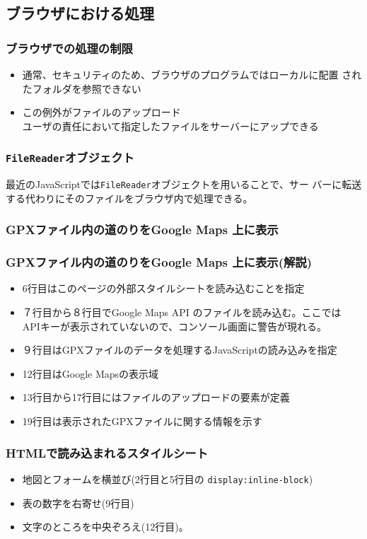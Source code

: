 \subsection{ブラウザにおける処理}
\begin{frame}[containsverbatim]
 \frametitle{ブラウザでの処理の制限}
 \begin{itemize}
  \item 通常、セキュリティのため、ブラウザのプログラムではローカルに配置
        されたフォルダを参照できない
  \item この例外がファイルのアップロード\\
        ユーザの責任において指定したファイルをサーバーにアップできる
 \end{itemize}
\end{frame}
\begin{frame}[containsverbatim]
 \frametitle{\texttt{FileReader}オブジェクト}
最近のJavaScriptでは\texttt{FileReader}オブジェクトを用いることで、サー
 バーに転送する代わりにそのファイルをブラウザ内で処理できる。
\end{frame}
\begin{frame}[containsverbatim]
 \frametitle{GPXファイル内の道のりをGoogle Maps 上に表示}
\end{frame}
\begin{frame}[containsverbatim]
 \frametitle{GPXファイル内の道のりをGoogle Maps 上に表示(解説)}
 \begin{itemize}
	\item 6行目はこのページの外部スタイルシートを読み込むことを指定
	\item ７行目から８行目でGoogle Maps API のファイルを読み込む。ここでは
				APIキーが表示されていないので、コンソール画面に警告が現れる。
	\item ９行目はGPXファイルのデータを処理するJavaScriptの読み込みを指定
	\item 12行目はGoogle Mapsの表示域
	\item 13行目から17行目にはファイルのアップロードの要素が定義
	\item 19行目は表示されたGPXファイルに関する情報を示す
 \end{itemize}
 \end{frame}
\begin{frame}[containsverbatim]
 \frametitle{HTMLで読み込まれるスタイルシート}
\begin{itemize}
 \item 地図とフォームを横並び(2行目と5行目の
       \texttt{display:inline-block})
 \item 表の数字を右寄せ(9行目)
 \item 文字のところを中央ぞろえ(12行目)。
\end{itemize}
 \end{frame}
